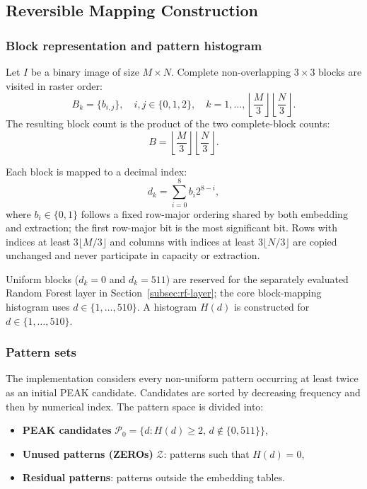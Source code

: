 \documentclass[a4paper,fleqn]{cas-dc}
\begin{document}
\subsection{Reversible Mapping Construction}

\subsubsection*{Block representation and pattern histogram}

Let $I$ be a binary image of size $M\times N$. Complete non-overlapping
$3\times3$ blocks are visited in raster order:
\begin{equation}
B_k=\{b_{i,j}\},\quad i,j\in\{0,1,2\},\quad
k=1,\ldots,\left\lfloor\frac{M}{3}\right\rfloor
\left\lfloor\frac{N}{3}\right\rfloor .
\label{eq:block-index}
\end{equation}
The resulting block count is the product of the two complete-block counts:
\begin{equation}
B=\left\lfloor\frac{M}{3}\right\rfloor
  \left\lfloor\frac{N}{3}\right\rfloor .
\label{eq:block-count}
\end{equation}

Each block is mapped to a decimal index:
\begin{equation}
d_k = \sum_{i=0}^{8} b_i 2^{8-i},
\label{eq:pattern-index}
\end{equation}
where $b_i \in \{0,1\}$ follows a fixed row-major ordering shared by both
embedding and extraction; the first row-major bit is the most significant bit.
Rows with indices at least $3\lfloor M/3\rfloor$ and columns with indices at
least $3\lfloor N/3\rfloor$ are copied unchanged and never participate in
capacity or extraction.

Uniform blocks ($d_k = 0$ and $d_k = 511$) are reserved for the separately
evaluated Random Forest layer in Section~\ref{subsec:rf-layer}; the core
block-mapping histogram uses $d\in\{1,\ldots,510\}$.
A histogram $H(d)$ is constructed for $d \in \{1,\ldots,510\}$.

\subsubsection*{Pattern sets}

The implementation considers every non-uniform pattern occurring at least
twice as an initial PEAK candidate. Candidates are sorted by decreasing
frequency and then by numerical index. The pattern space is divided into:
\begin{itemize}
    \item \textbf{PEAK candidates} $\mathcal{P}_0=\{d:H(d)\geq2,\,
    d\notin\{0,511\}\}$,
    \item \textbf{Unused patterns (ZEROs)} $\mathcal{Z}$: patterns such that $H(d)=0$,
    \item \textbf{Residual patterns}: patterns outside the embedding tables.
\end{itemize}
\end{document}
